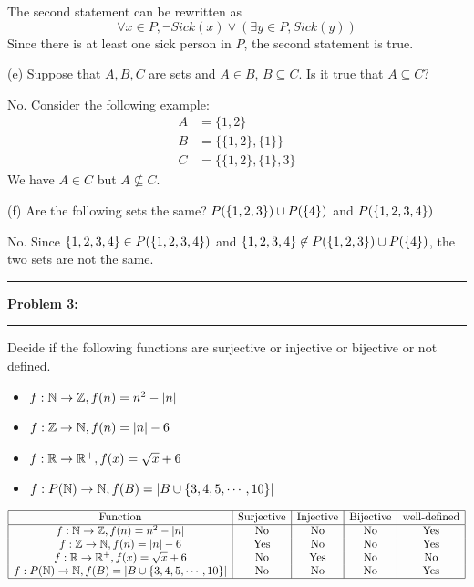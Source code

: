 \documentclass[11pt]{article}
\newcommand\question[2]{\vspace{.25in}\hrule\textbf{#1: #2}\vspace{.5em}\hrule\vspace{.10in}}
\begin{document}
The second statement can be rewritten as
\[\forall x\in P, \lnot Sick(x) \lor (\exists y\in P, Sick(y))\]
Since there is at least one sick person in $P$, the second statement is true.

(e) Suppose that $A,B,C$ are sets and $A\in B$, $B\subseteq C$. Is it true that $A\subseteq C$?
\solution

No. Consider the following example:
\begin{align*}
    A &= \{1,2\}\\
    B &= \{\{1,2\}, \{1\}\}\\
    C &= \{\{1,2\}, \{1\}, 3\}
\end{align*}
We have $A\in C$ but $A\not\subseteq C$.

(f) Are the following sets the same? $P(\{1,2,3\})\cup P(\{4\})$ and $P(\{1,2,3,4\})$
\solution

No. Since $\{1,2,3,4\}\in P(\{1,2,3,4\})$ and $\{1,2,3,4\}\not\in P(\{1,2,3\})\cup P(\{4\})$, the two sets are not the same.

\question{Problem 3}{}

Decide if the following functions are surjective or injective or bijective or not defined.

\begin{itemize}
    \item $f: \mathbb{N}\to\mathbb{Z}, f(n)=n^2-|n|$
    \item $f: \mathbb{Z}\to\mathbb{N}, f(n)=|n|-6$
    \item $f: \mathbb{R}\to\mathbb{R}^{+}, f(x) = \sqrt{x} +6$
    \item $f:P(\mathbb{N})\to \mathbb{N}, f(B)=|B\cup \{3,4,5,\cdots, 10\}|$
\end{itemize}

\solution

\[
\begin{array}{|c|c|c|c|c|}
\hline
\text{Function} & \text{Surjective} & \text{Injective} & \text{Bijective} & \text{well-defined} \\
\hline
f: \mathbb{N}\to\mathbb{Z}, f(n)=n^2-|n| & \text{No} & \text{No} & \text{No} & \text{Yes} \\
f: \mathbb{Z}\to\mathbb{N}, f(n)=|n|-6 & \text{Yes} & \text{No} & \text{No} & \text{Yes} \\
f: \mathbb{R}\to\mathbb{R}^{+}, f(x) = \sqrt{x} +6 & \text{No} & \text{Yes} & \text{No} & \text{No} \\
f:P(\mathbb{N})\to \mathbb{N}, f(B)=|B\cup \{3,4,5,\cdots, 10\}| & \text{No} & \text{No} & \text{No} & \text{Yes}\\
\hline
\end{array}
\]
\end{document}
